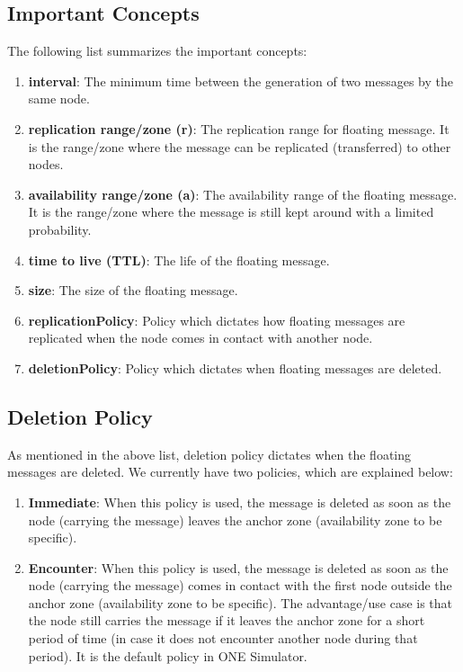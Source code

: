 \subsection{Important Concepts}
The following list summarizes the important concepts:
\begin{enumerate}
  \item \textbf{interval}: The minimum time between the generation of two messages by the same node.
  \item \textbf{replication range/zone (r)}: The replication range for floating message. It is the range/zone where the message can be replicated (transferred) to other nodes.
  \item \textbf{availability range/zone (a)}: The availability range of the floating message. It is the range/zone where the message is still kept around with a limited probability.
  \item \textbf{time to live (TTL)}: The life of the floating message.
  \item \textbf{size}: The size of the floating message.
  \item \textbf{replicationPolicy}: Policy which dictates how floating messages are replicated when the node comes in contact with another node.
  \item \textbf{deletionPolicy}: Policy which dictates when floating messages are deleted.
\end{enumerate}

\subsection {Deletion Policy}
As mentioned in the above list, deletion policy dictates when the floating messages are deleted. We currently have two policies, which are explained below:
  \begin{enumerate}
    \item \textbf{Immediate}: When this policy is used, the message is deleted as soon as the node (carrying the message) leaves the anchor zone (availability zone to be specific).
    \item \textbf{Encounter}: When this policy is used, the message is deleted as soon as the node (carrying the message) comes in contact with the first node outside the anchor zone (availability zone to be specific). The advantage/use case is that the node still carries the message if it leaves the anchor zone for a short period of time (in case it does not encounter another node during that period). It is the default policy in ONE Simulator.
  \end{enumerate}

